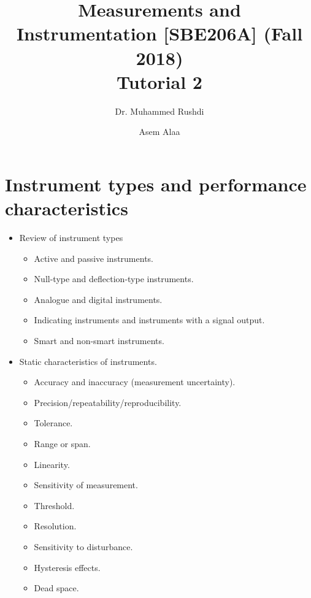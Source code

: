 \documentclass[a4paper,11pt]{book}
\begin{document}
\author{Dr. Muhammed Rushdi \and Asem Alaa}

\title{Measurements and Instrumentation [SBE206A] (Fall 2018)\\ Tutorial 2}

\maketitle

\chapter*{Instrument types and performance characteristics}

\begin{itemize}
\item Review of instrument types
\begin{itemize}
\item Active and passive instruments.
\item Null-type and deflection-type instruments.
\item Analogue and digital instruments.
\item Indicating instruments and instruments with a signal output.
\item Smart and non-smart instruments.
\end{itemize}
\item Static characteristics of instruments.
\begin{itemize}
\item Accuracy and inaccuracy (measurement uncertainty).
\item Precision/repeatability/reproducibility.
\item Tolerance.
\item Range or span.
\item Linearity.
\item Sensitivity of measurement.
\item Threshold.
\item Resolution.
\item Sensitivity to disturbance.
\item Hysteresis effects.
\item Dead space.
\end{itemize}
\end{itemize}
\end{document}
